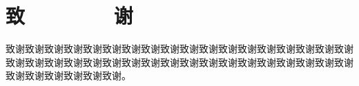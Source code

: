 \section*{致\ \ \ \ \ \ \ \ 谢}

致谢致谢致谢致谢致谢致谢致谢致谢致谢致谢致谢致谢致谢致谢致谢致谢致谢致谢致谢致谢致谢致谢致谢致谢致谢致谢致谢致谢致谢致谢致谢致谢致谢致谢致谢致谢致谢致谢致谢致谢致谢致谢。\par
